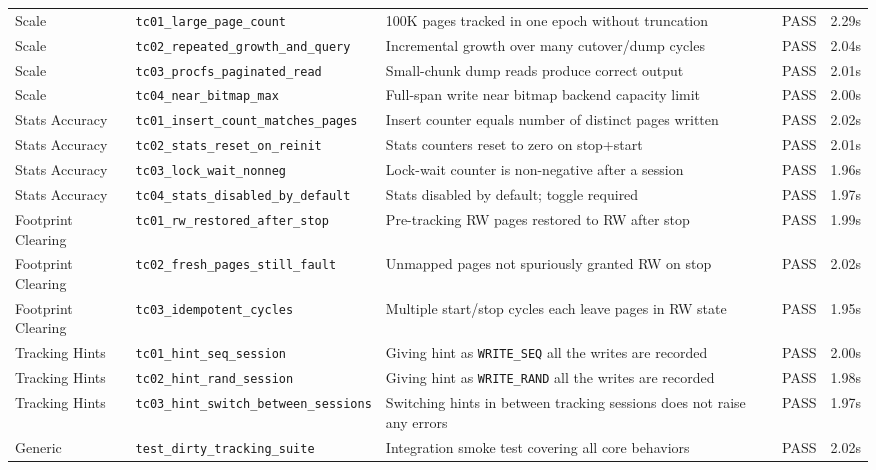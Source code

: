 \begin{center}
\begin{longtable}{>{\raggedright\arraybackslash}p{2.0cm} >{\raggedright\arraybackslash}p{4.5cm} >{\raggedright\arraybackslash}p{6.2cm} >{\raggedright\arraybackslash}p{1.0cm} >{\raggedright\arraybackslash}p{1.1cm}}
Scale & \texttt{tc01\_large\_page\_count} & 100K pages tracked in one epoch without truncation & PASS & 2.29s \\
Scale & \texttt{tc02\_repeated\_growth\_and\_query} & Incremental growth over many cutover/dump cycles & PASS & 2.04s \\
Scale & \texttt{tc03\_procfs\_paginated\_read} & Small-chunk dump reads produce correct output & PASS & 2.01s \\
Scale & \texttt{tc04\_near\_bitmap\_max} & Full-span write near bitmap backend capacity limit & PASS & 2.00s \\
\midrule

Stats Accuracy & \texttt{tc01\_insert\_count\_matches\_pages} & Insert counter equals number of distinct pages written & PASS & 2.02s \\
Stats Accuracy & \texttt{tc02\_stats\_reset\_on\_reinit} & Stats counters reset to zero on stop+start & PASS & 2.01s \\
Stats Accuracy & \texttt{tc03\_lock\_wait\_nonneg} & Lock-wait counter is non-negative after a session & PASS & 1.96s \\
Stats Accuracy & \texttt{tc04\_stats\_disabled\_by\_default} & Stats disabled by default; toggle required & PASS & 1.97s \\
\midrule

Footprint Clearing & \texttt{tc01\_rw\_restored\_after\_stop} & Pre-tracking RW pages restored to RW after stop & PASS & 1.99s \\
Footprint Clearing & \texttt{tc02\_fresh\_pages\_still\_fault} & Unmapped pages not spuriously granted RW on stop & PASS & 2.02s \\
Footprint Clearing & \texttt{tc03\_idempotent\_cycles} & Multiple start/stop cycles each leave pages in RW state & PASS & 1.95s \\
\midrule

Tracking Hints & \texttt{tc01\_hint\_seq\_session} & Giving hint as \texttt{WRITE\_SEQ} all the writes are recorded & PASS & 2.00s \\
Tracking Hints & \texttt{tc02\_hint\_rand\_session} & Giving hint as \texttt{WRITE\_RAND} all the writes are recorded & PASS & 1.98s \\
Tracking Hints & \texttt{tc03\_hint\_switch\_between\_sessions} & Switching hints in between tracking sessions does not raise any errors & PASS & 1.97s \\
\midrule

Generic & \texttt{test\_dirty\_tracking\_suite} & Integration smoke test covering all core behaviors & PASS & 2.02s \\

\end{longtable}
\normalsize
\end{center}

